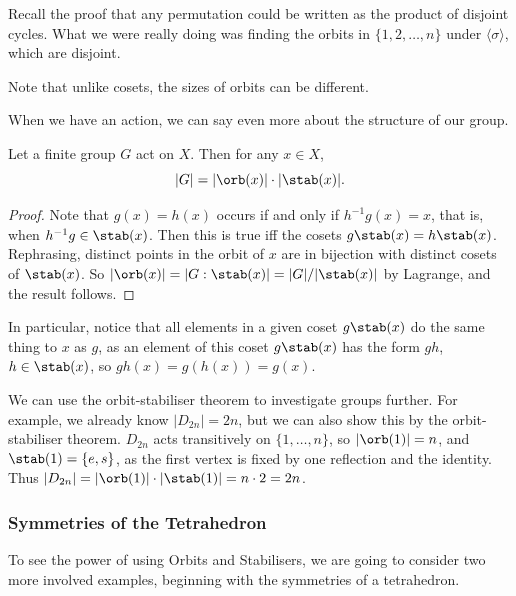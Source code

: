 \documentclass[a4paper]{scrartcl}
\newcommand{\newsubsection}{\subsubsection}
\begin{document}
Recall the proof that any permutation could be written as the product of disjoint cycles. What we were really doing was finding the orbits in $\{1, 2, \dots, n\}$ under $\langle \sigma \rangle$, which are disjoint.

\begin{remark}
	Note that unlike cosets, the sizes of orbits can be different.
\end{remark}

When we have an action, we can say even more about the structure of our group.

\begin{theorem}
	Let a finite group $G$ act on $X$. Then for any $x \in X$,
	$$
	|G| = |\orb(x)| \cdot |\stab(x)|.
	$$
\end{theorem}
\begin{proof}
	Note that $g(x) = h(x)$ occurs if and only if $h^{-1} g (x) = x$, that is, when $h^{-1} g \in \stab(x)$. Then this is true iff the cosets $g \stab(x) = h\stab(x)$. Rephrasing, distinct points in the orbit of $x$ are in bijection with distinct cosets of $\stab(x)$. So $|\orb(x)| = |G : \stab(x)| = |G| / |\stab(x) |$ by Lagrange, and the result follows.
\end{proof}

In particular, notice that all elements in a given coset $g \stab(x)$ do the same thing to $x$ as $g$, as an element of this coset $g\stab(x)$ has the form $gh$, $h \in \stab(x)$, so $gh(x) = g(h(x)) = g(x)$.

We can use the orbit-stabiliser theorem to investigate groups further. For example, we already know $|D_{2n}| = 2n$, but we can also show this by the orbit-stabiliser theorem. $D_{2n}$ acts transitively on $\{1, \dots, n\}$, so $|\orb(1)| = n$, and $\stab(1) = \{e, s\}$, as the first vertex is fixed by one reflection and the identity. Thus $|D_{2n}| = |\orb(1)| \cdot |\stab(1)| = n \cdot 2 = 2n$.


\newsubsection{Symmetries of the Tetrahedron}

To see the power of using Orbits and Stabilisers, we are going to consider two more involved examples, beginning with the symmetries of a tetrahedron.
\end{document}
